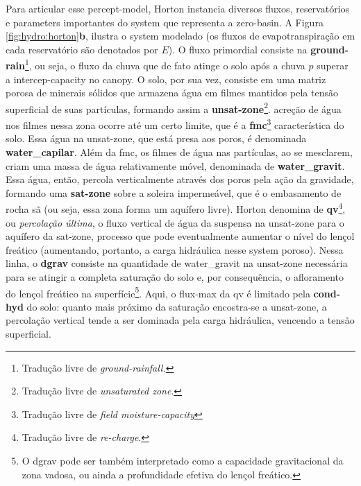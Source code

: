 \documentclass[./main.tex]{subfiles}
\begin{document}
\par Para articular esse \gls{percept-model}, Horton instancia diversos fluxos, reservatórios e \gls{parameters} importantes do \gls{system} que representa a \gls{zero-basin}. A Figura \ref{fig:hydro:horton}\textbf{b}, ilustra o \gls{system} modelado (os fluxos de evapotranspiração em cada reservatório são denotados por $E$). O fluxo primordial consiste na \textbf{\gls{ground-rain}}\footnote{Tradução livre de \textit{ground-rainfall.}}, ou seja, o fluxo da chuva que de fato atinge o solo após a chuva $p$ superar a \gls{intercep-capacity} no \gls{canopy}. O solo, por sua vez, consiste em uma matriz porosa de minerais sólidos que armazena água em filmes mantidos pela tensão superficial de suas partículas, formando assim a \textbf{\gls{unsat-zone}}\footnote{Tradução livre de \textit{unsaturated zone}.}. acreção de água nos filmes nessa zona ocorre até um certo limite, que é a \textbf{\gls{fmc}}\footnote{Tradução livre de \textit{field moisture-capacity}} característica do solo. Essa água na \gls{unsat-zone}, que está presa aos poros, é denominada \textbf{\gls{water_capilar}}. Além da \gls{fmc}, os filmes de água nas partículas, ao se mesclarem, criam uma massa de água relativamente móvel, denominada de \textbf{\gls{water_gravit}}. Essa água, então, percola verticalmente através dos poros pela ação da gravidade, formando uma \textbf{\gls{sat-zone}} sobre a soleira impermeável, que é o embasamento de rocha sã (ou seja, essa zona forma um aquífero livre). Horton denomina de \textbf{\gls{qv}}\footnote{Tradução livre de \textit{re-charge}.}, ou \textit{percolação última}, o fluxo vertical de água da suspensa na \gls{unsat-zone} para o aquífero da \gls{sat-zone}, processo que pode eventualmente aumentar o nível do lençol freático (aumentando, portanto, a carga hidráulica nesse \gls{system} poroso). Nessa linha, o \textbf{\gls{dgrav}} consiste na quantidade de \gls{water_gravit} na \gls{unsat-zone} necessária para se atingir a completa saturação do solo e, por consequência, o afloramento do lençol freático na superfície\footnote{O \gls{dgrav} pode ser também interpretado como a capacidade gravitacional da zona vadosa, ou ainda a profundidade efetiva do lençol freático.}. Aqui, o \gls{flux-max} da \gls{qv} é limitado pela \textbf{\gls{cond-hyd}} do solo: quanto mais próximo da saturação encostra-se a \gls{unsat-zone}, a percolação vertical tende a ser dominada pela carga hidráulica, vencendo a tensão superficial.
\end{document}

